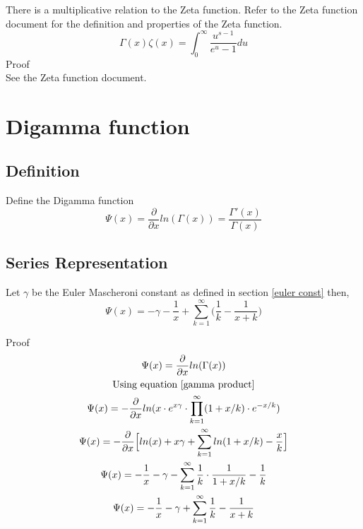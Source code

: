 \documentclass[a4paper]{article}
\begin{document}
\begin{theorem}
There is a multiplicative relation to the Zeta function. Refer to the Zeta function document for the definition and properties of the Zeta function.
\begin{equation}
\boxed{
\Gamma(x) \zeta(x) = \int_{0}^{\infty} \frac{u^{s-1}}{e^{u} - 1} du}
\end{equation}
Proof
\\
See the Zeta function document.
\end{theorem}


\section{Digamma function}
\subsection{Definition}
Define the Digamma function 
\begin{equation}\label{digamma def}
\Psi(x) = \frac{\partial}{\partial x}  ln(\Gamma(x)) = \frac{\Gamma'(x)}{\Gamma(x)}
\end{equation}

\subsection{Series Representation}

\begin{theorem}
Let $\gamma$ be the Euler Mascheroni constant as defined in section \ref{euler const} then, 
\begin{equation} \label{psi series}
\boxed{
\Psi(x) = -\gamma - \frac{1}{x} + \sum_{k=1}^{\infty} \Big( \frac{1}{k} - \frac{1}{x+k}  \Big)
}
\end{equation}

Proof
\\
\begin{gather*}
\Psi(x) = \frac{\partial}{\partial x}  ln(\Gamma(x))
\\
\text{Using equation \ref{gamma product}}
\\
\Psi(x) = -\frac{\partial}{\partial x} ln(x \cdot e^{x \gamma} \cdot \prod_{k=1}^{\infty} (1 + x/k) \cdot e^{-x/k})
\\
\Psi(x) = -\frac{\partial}{\partial x} \Big[ ln(x) +  x \gamma + \sum_{k=1}^{\infty} ln(1 + x/k) - \frac{x}{k}
\Big]
\\
\Psi(x) = -\frac{1}{x}  -  \gamma - \sum_{k=1}^{\infty} \frac{1}{k} \cdot \frac{1}{1 + x/k} - \frac{1}{k}
\\
\Psi(x) = -\frac{1}{x}  -  \gamma + \sum_{k=1}^{\infty} \frac{1}{k} - \frac{1}{x + k}
\end{gather*}
\end{theorem}
\end{document}
